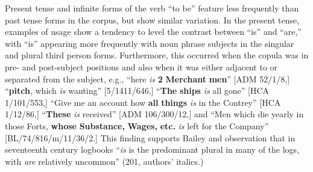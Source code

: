   Present tense and infinite forms of the verb “to be” feature less frequently than past tense forms in the corpus, but show similar variation. In the present tense, examples of usage show a tendency to level the contrast between “is” and “are,” with “is” appearing more frequently with noun phrase subjects in the singular and plural third person forms. Furthermore, this occurred when the copula was in pre- and post-subject positions and also when it was either adjacent to or separated from the subject, e.g., “here \textit{is} \textbf{2} \textbf{Merchant} \textbf{men}” [ADM 52/1/8,] “\textbf{pitch}, which \textit{is} wanting” [5/1411/646,] “\textbf{The} \textbf{ships} \textit{is} all gone” [HCA 1/101/553,] “Give me an account how \textbf{all} \textbf{things} \textit{is} in the Contrey” [HCA 1/12/86,] “\textbf{These} \textit{is} received” [ADM 106/300/12,] and “Men which die yearly in those Forts, \textbf{whose} \textbf{Substance,} \textbf{Wages,} \textbf{etc.} \textit{is} left for the Company” [BL/74/816/m/11/36/2.] This finding supports Bailey and  observation that in seventeenth century logbooks “\textit{is} is the predominant plural in many of the logs, with \textit{are} relatively uncommon” (201, authors’ italics.) 

